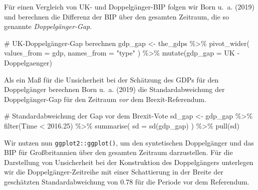 \documentclass[
  a4paper,
  DIV=11,
  oneside]{scrreprt}
\newenvironment{Shaded}{\begin{snugshade}}{\end{snugshade}}
\newcommand{\AttributeTok}[1]{\textcolor[rgb]{0.40,0.45,0.13}{#1}}
\newcommand{\CommentTok}[1]{\textcolor[rgb]{0.37,0.37,0.37}{#1}}
\newcommand{\FloatTok}[1]{\textcolor[rgb]{0.68,0.00,0.00}{#1}}
\newcommand{\FunctionTok}[1]{\textcolor[rgb]{0.28,0.35,0.67}{#1}}
\newcommand{\NormalTok}[1]{\textcolor[rgb]{0.00,0.23,0.31}{#1}}
\newcommand{\OtherTok}[1]{\textcolor[rgb]{0.00,0.23,0.31}{#1}}
\newcommand{\SpecialCharTok}[1]{\textcolor[rgb]{0.37,0.37,0.37}{#1}}
\newcommand{\StringTok}[1]{\textcolor[rgb]{0.13,0.47,0.30}{#1}}
\begin{document}
Für einen Vergleich von UK- und Doppelgänger-BIP folgen wir Born u.~a.
(2019) und berechnen die Differenz der BIP über den gesamten Zeitraum,
die so genannte \emph{Doppelgänger-Gap}.

\begin{Shaded}
\begin{Highlighting}[]
\CommentTok{\# UK{-}Doppelgänger{-}Gap berechnen}
\NormalTok{gdp\_gap }\OtherTok{\textless{}{-}}\NormalTok{ the\_gdps }\SpecialCharTok{\%\textgreater{}\%} 
  \FunctionTok{pivot\_wider}\NormalTok{(}
    \AttributeTok{values\_from =}\NormalTok{ gdp, }
    \AttributeTok{names\_from =} \StringTok{"type"}
\NormalTok{  ) }\SpecialCharTok{\%\textgreater{}\%}
  \FunctionTok{mutate}\NormalTok{(}\AttributeTok{gdp\_gap =}\NormalTok{ UK }\SpecialCharTok{{-}}\NormalTok{ Doppelgaenger)}
\end{Highlighting}
\end{Shaded}

Als ein Maß für die Unsicherheit bei der Schätzung des GDPs für den
Doppelgänger berechnen Born u.~a. (2019) die Standardabweichung der
Doppelgänger-Gap für den Zeitraum \emph{vor} dem Brexit-Referendum.

\begin{Shaded}
\begin{Highlighting}[]
\CommentTok{\# Standardabweichung der Gap vor dem Brexit{-}Vote}
\NormalTok{sd\_gap }\OtherTok{\textless{}{-}}\NormalTok{ gdp\_gap }\SpecialCharTok{\%\textgreater{}\%}
  \FunctionTok{filter}\NormalTok{(Time }\SpecialCharTok{\textless{}} \FloatTok{2016.25}\NormalTok{) }\SpecialCharTok{\%\textgreater{}\%} 
  \FunctionTok{summarise}\NormalTok{(}
    \AttributeTok{sd =} \FunctionTok{sd}\NormalTok{(gdp\_gap)}
\NormalTok{  ) }\SpecialCharTok{\%\textgreater{}\%} 
  \FunctionTok{pull}\NormalTok{(sd)}
\end{Highlighting}
\end{Shaded}

Wir nutzen nun \texttt{ggplot2::ggplot()}, um den syntetischen
Doppelgänger und das BIP für Großbritannien über den gesamten Zeitraum
darzustellen. Für die Darstellung von Unsicherheit bei der Konstruktion
des Doppelgängers unterlegen wir die Doppelgänger-Zeitreihe mit einer
Schattierung in der Breite der geschätzten Standardabweichung von 0.78
für die Periode vor dem Referendum.
\end{document}
